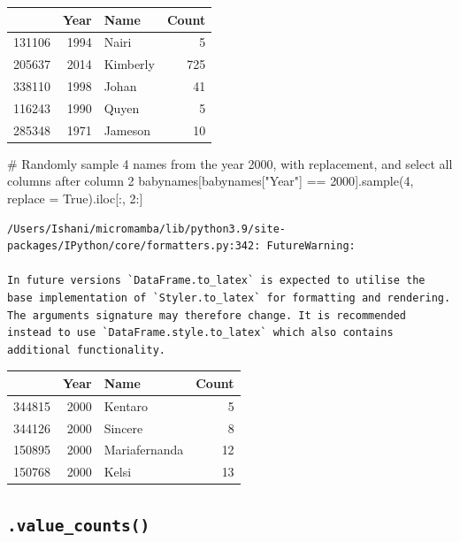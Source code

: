 \documentclass[
  letterpaper,
  DIV=11,
  numbers=noendperiod]{scrreprt}
\newenvironment{Shaded}{\begin{snugshade}}{\end{snugshade}}
\newcommand{\CommentTok}[1]{\textcolor[rgb]{0.37,0.37,0.37}{#1}}
\newcommand{\DecValTok}[1]{\textcolor[rgb]{0.68,0.00,0.00}{#1}}
\newcommand{\NormalTok}[1]{\textcolor[rgb]{0.00,0.23,0.31}{#1}}
\newcommand{\OperatorTok}[1]{\textcolor[rgb]{0.37,0.37,0.37}{#1}}
\newcommand{\StringTok}[1]{\textcolor[rgb]{0.13,0.47,0.30}{#1}}
\newcommand{\VariableTok}[1]{\textcolor[rgb]{0.07,0.07,0.07}{#1}}
\begin{document}
\begin{tabular}{lrlr}
\toprule
{} &  Year &      Name &  Count \\
\midrule
131106 &  1994 &     Nairi &      5 \\
205637 &  2014 &  Kimberly &    725 \\
338110 &  1998 &     Johan &     41 \\
116243 &  1990 &     Quyen &      5 \\
285348 &  1971 &   Jameson &     10 \\
\bottomrule
\end{tabular}

\begin{Shaded}
\begin{Highlighting}[]
\CommentTok{\# Randomly sample 4 names from the year 2000, with replacement, and select all columns after column 2}
\NormalTok{babynames[babynames[}\StringTok{"Year"}\NormalTok{] }\OperatorTok{==} \DecValTok{2000}\NormalTok{].sample(}\DecValTok{4}\NormalTok{, replace }\OperatorTok{=} \VariableTok{True}\NormalTok{).iloc[:, }\DecValTok{2}\NormalTok{:]}
\end{Highlighting}
\end{Shaded}

\begin{verbatim}
/Users/Ishani/micromamba/lib/python3.9/site-packages/IPython/core/formatters.py:342: FutureWarning:

In future versions `DataFrame.to_latex` is expected to utilise the base implementation of `Styler.to_latex` for formatting and rendering. The arguments signature may therefore change. It is recommended instead to use `DataFrame.style.to_latex` which also contains additional functionality.
\end{verbatim}

\begin{tabular}{lrlr}
\toprule
{} &  Year &           Name &  Count \\
\midrule
344815 &  2000 &        Kentaro &      5 \\
344126 &  2000 &        Sincere &      8 \\
150895 &  2000 &  Mariafernanda &     12 \\
150768 &  2000 &          Kelsi &     13 \\
\bottomrule
\end{tabular}

\hypertarget{value_counts}{%
\subsection{\texorpdfstring{\texttt{.value\_counts()}}{.value\_counts()}}\label{value_counts}}
\end{document}
